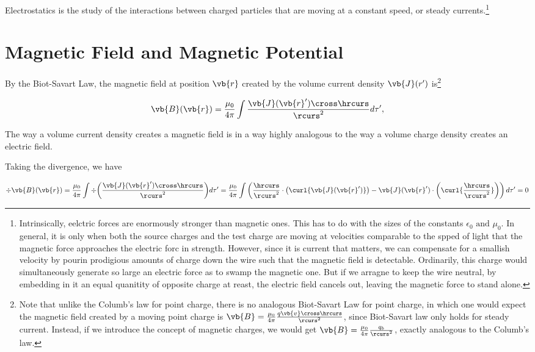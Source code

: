 \documentclass[english,a4paper,12pt]{report}
\begin{document}
Electrostatics is the study of the interactions between charged particles that are moving at a constant speed, or steady currents.\footnote{Intrinsically, eelctric forces are enormously stronger than magnetic ones. This has to do with the sizes of the constants \(\epsilon_0 \text { and } \mu_0 \). In general, it is only when both the source charges and the test charge are moving at velocities comparable to the spped of light that the magnetic force approaches the electric forc in strength. However, since it is current that matters, we can compensate for a smallish velocity by pourin prodigious amounts of charge down the wire such that the magnetic field is detectable. Ordinarily, this charge would simultaneously generate so large an electric force as to swamp the magnetic one. But if we arragne to keep the wire neutral, by embedding in it an equal quanitity of opposite charge at reast, the electric field cancels out, leaving the magnetic force to stand alone.} 

\section{Magnetic Field and Magnetic Potential}

By the Biot-Savart Law, the magnetic field at position \(\vb{r} \) created by the volume current density \(\vb{J} (r')\) is\footnote{Note that unlike the Columb's law for point charge, there is no analogous Biot-Savart Law for point charge, in which one would expect the magnetic field created by a moving point charge is \(\vb{B} = \frac{\mu_0}{4\pi} \frac{q \vb{v} \cross \hrcurs }{\rcurs ^2} \), since Biot-Savart law only holds for steady current. Instead, if we introduce the concept of magnetic charges, we would get \(\vb{B} = \frac{\mu_0}{4\pi} \frac{q_{b} }{\rcurs ^2} \), exactly analogous to the Columb's law.} 

\begin{equation}
    \vb{B} (\vb{r} ) = \frac{\mu _{0} }{4\pi }\int \frac{\vb{J} (\vb{r} ') \cross \hrcurs}{\rcurs ^2 } d\tau ',  
\end{equation}

The way a volume current density creates a magnetic field is in a way highly analogous to the way a volume charge density creates an electric field.

Taking the divergence, we have

\begin{equation}
    \div{\vb{B}(\vb{r} )} = \frac{\mu _{0} }{4\pi }\int \div{ \left(\frac{\vb{J} (\vb{r} ') \cross \hrcurs}{\rcurs ^2 }\right) } d\tau ' = \frac{\mu _{0} }{4\pi }\int \left( \frac{\hrcurs }{\rcurs ^2} \cdot \left(\curl{ \vb{J}(\vb{r} ') }\right) - \vb{J}(\vb{r} ') \cdot \left(\curl{ \frac{\hrcurs }{\rcurs ^2}  } \right) \right)  d\tau ' = 0
\end{equation}
\end{document}
